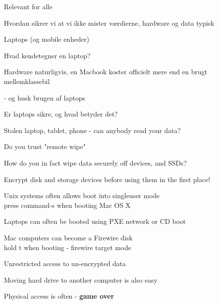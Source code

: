 \documentclass[Screen16to9,17pt]{foils}
\begin{document}


\begin{list2}
\item Relevant for alle
\item Hvordan sikrer vi at vi ikke mister værdierne, hardware og data typisk
\end{list2}




\begin{list2}
\item Laptops (og mobile enheder)
\item Hvad kendetegner en laptop?
\item Hardware naturligvis, en Macbook koster officielt mere end en brugt mellemklassebil
\item - og husk brugen af laptops
\item Er laptops sikre, og hvad betyder det?
\end{list2}





\begin{list1}
\item Stolen laptop, tablet, phone - can anybody read your data?
\item Do you trust "remote wipe"
\item How do you in fact wipe data securely off devices, and SSDs?
\item Encrypt disk and storage devices before using them in the first place!
\end{list1}


\begin{list1}
\item Unix systems often allows boot into singleuser mode\\
press command-s when booting Mac OS X
\item Laptops can often be booted using PXE network or CD boot
\item Mac computers can become a Firewire disk\\
hold t when booting - firewire target mode
\item Unrestricted access to un-encrypted data
\item Moving hard drive to another computer is also easy
\end{list1}
\pause
\centerline{Physical access is often - {\bf game over}}
\end{document}
